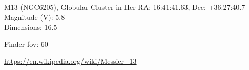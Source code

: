 \begin{block}{M13 (NGC6205), Globular Cluster in Her}
    RA: 16:41:41.63, Dec: +36:27:40.7 \\ 
    Magnitude (V): 5.8 \\ 
    Dimensions: 16.5 

    Finder fov: 60 

    \url{https://en.wikipedia.org/wiki/Messier_13} 
\end{block}